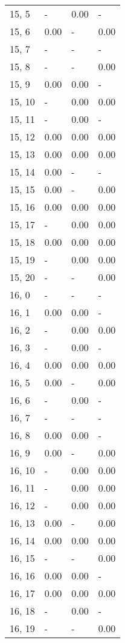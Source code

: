 \begin{table}
\begin{tabular}{llll}
15, 5  &     - &  0.00 &     - \\
15, 6  &  0.00 &     - &  0.00 \\
15, 7  &     - &     - &     - \\
15, 8  &     - &     - &  0.00 \\
15, 9  &  0.00 &  0.00 &     - \\
15, 10 &     - &  0.00 &  0.00 \\
15, 11 &     - &  0.00 &     - \\
15, 12 &  0.00 &  0.00 &  0.00 \\
15, 13 &  0.00 &  0.00 &  0.00 \\
15, 14 &  0.00 &     - &     - \\
15, 15 &  0.00 &     - &  0.00 \\
15, 16 &  0.00 &  0.00 &  0.00 \\
15, 17 &     - &  0.00 &  0.00 \\
15, 18 &  0.00 &  0.00 &  0.00 \\
15, 19 &     - &  0.00 &  0.00 \\
15, 20 &     - &     - &  0.00 \\
16, 0  &     - &     - &     - \\
16, 1  &  0.00 &  0.00 &     - \\
16, 2  &     - &  0.00 &  0.00 \\
16, 3  &     - &  0.00 &     - \\
16, 4  &  0.00 &  0.00 &  0.00 \\
16, 5  &  0.00 &     - &  0.00 \\
16, 6  &     - &  0.00 &     - \\
16, 7  &     - &     - &     - \\
16, 8  &  0.00 &  0.00 &     - \\
16, 9  &  0.00 &     - &  0.00 \\
16, 10 &     - &  0.00 &  0.00 \\
16, 11 &     - &  0.00 &  0.00 \\
16, 12 &     - &  0.00 &  0.00 \\
16, 13 &  0.00 &     - &  0.00 \\
16, 14 &  0.00 &  0.00 &  0.00 \\
16, 15 &     - &     - &  0.00 \\
16, 16 &  0.00 &  0.00 &     - \\
16, 17 &  0.00 &  0.00 &  0.00 \\
16, 18 &     - &  0.00 &     - \\
16, 19 &     - &     - &  0.00 \\

\end{tabular}
\end{table}
